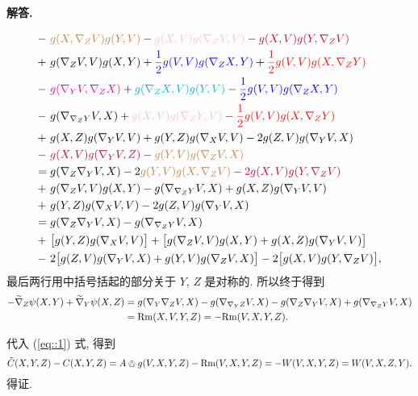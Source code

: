\documentclass{ctexart}
\newenvironment{solution}{\par\noindent\textbf{解答. }}{\par}
\newcommand{\cred}{\textcolor{red}}
\newcommand{\cblue}{\textcolor{blue}}
\newcommand{\ccyan}{\textcolor{cyan}}
\newcommand{\cmag}{\textcolor{magenta}}
\newcommand{\cpink}{\textcolor{pink}}
\begin{document}
\begin{solution}
\begin{enumerate}
\[\begin{aligned}
               -{\ } & \textcolor{brown}{g(X, \Div{Z}V)g(Y, V)} - \cpink{g(X, V)g(\Div{Z}Y, V)} - \textcolor{purple}{g(X, V)g(Y, \Div{Z}V)} \\
               +{\ } & g(\Div{Z}V, V)g(X, Y) + \cblue{\dfrac{1}{2}g(V, V)g(\Div{Z}X, Y)} + \cred{\dfrac{1}{2}g(V, V)g(X, \Div{Z}Y)} \\
               -{\ } & \cmag{g(\Div{Y}V, \Div{Z}X)} + \ccyan{g(\Div{Z}X, V)g(Y, V)} - \cblue{\dfrac{1}{2}g(V, V)g(\Div{Z}X, Y)} \\
               -{\ } & g(\Div{\Div{Z}Y}V, X) + \cpink{g(X, V)g(\Div{Z}Y, V)} - \cred{\dfrac{1}{2}g(V, V)g(X, \Div{Z}Y)} \\
               +{\ } & g(X, Z)g(\Div{Y}V, V) + g(Y, Z)g(\Div{X}V, V) - 2g(Z, V)g(\Div{Y}V, X)  \\
               -{\ } & \textcolor{purple}{g(X, V)g(\Div{Y}V, Z)} - \textcolor{brown}{g(Y, V)g(\Div{Z}V, X)} \\
               ={  } & g(\Div{Z}\Div{Y}V, X) - 2\textcolor{brown}{g(Y, V)g(X, \Div{Z}V)} - \textcolor{purple}{2g(X, V)g(Y, \Div{Z}V)} \\
               +{\ } & g(\Div{Z}V, V)g(X, Y) - g(\Div{\Div{Z}Y}V, X) + g(X, Z)g(\Div{Y}V, V) \\
               +{\ } & g(Y, Z)g(\Div{X}V, V) - 2g(Z, V)g(\Div{Y}V, X) \\
               ={  } & g(\Div{Z}\Div{Y}V, X) - g(\Div{\Div{Z}Y}V, X) \\
               +{\ } & \bigl[ g(Y, Z)g(\Div{X}V, V) \bigr] + \bigl[ g(\Div{Z}V, V)g(X, Y) + g(X, Z)g(\Div{Y}V, V) \bigr] \\
               -{\ } & 2\bigl[ g(Z, V)g(\Div{Y}V, X) + g(Y, V)g(\Div{Z}V, X) \bigr] - 2\bigl[ g(X, V)g(Y, \Div{Z}V) \bigr],
           \end{aligned}
        \]
        最后两行用中括号括起的部分关于 $Y$, $Z$ 是对称的. 所以终于得到
        \[
            \begin{aligned}
            -\widetilde{\nabla}_{Z}\psi(X, Y) + \widetilde{\nabla}_{Y}\psi(X, Z) ={}& g(\nabla_{Y}\nabla_{Z}V, X) - g(\nabla_{\nabla_{Y}Z}V, X) - g(\nabla_{Z}\nabla_{Y}V, X) + g(\nabla_{\nabla_{Z}Y}V, X) \\
            ={}& \mathrm{Rm}(X, V, Y, Z) = -\mathrm{Rm}(V, X, Y, Z).
            \end{aligned}
        \]

        代入 (\ref{eq::1}) 式, 得到
        \[
            \tilde{C}(X, Y, Z) - C(X, Y, Z) = A \owedge g(V, X, Y, Z) - \mathrm{Rm}(V, X, Y, Z) = -W(V, X, Y, Z) = W(V, X, Z, Y).
        \]
        得证.
    \end{enumerate}
\end{solution}
\end{document}
